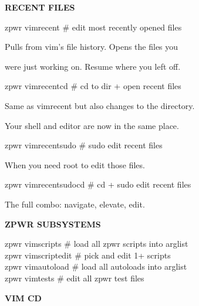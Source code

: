 \documentclass[11pt,a4paper,twoside]{book}
\begin{document}
\vspace{12pt}
{\bfseries\color{neonyellow} RECENT FILES}\vspace{4pt}

\begin{codebox}
zpwr vimrecent          \# edit most recently opened files\\
\end{codebox}

Pulls from vim's file history. Opens the files you

were just working on. Resume where you left off.

\begin{codebox}
zpwr vimrecentcd        \# cd to dir + open recent files\\
\end{codebox}

Same as vimrecent but also changes to the directory.

Your shell and editor are now in the same place.

\begin{codebox}
zpwr vimrecentsudo      \# sudo edit recent files\\
\end{codebox}

When you need root to edit those files.

\begin{codebox}
zpwr vimrecentsudocd    \# cd + sudo edit recent files\\
\end{codebox}

The full combo: navigate, elevate, edit.


\vspace{12pt}
{\bfseries\color{neonyellow} ZPWR SUBSYSTEMS}\vspace{4pt}

\begin{codebox}
zpwr vimscripts         \# load all zpwr scripts into arglist\\
zpwr vimscriptedit      \# pick and edit 1+ scripts\\
zpwr vimautoload        \# load all autoloads into arglist\\
zpwr vimtests           \# edit all zpwr test files\\
\end{codebox}


\vspace{12pt}
{\bfseries\color{neonyellow} VIM CD}\vspace{4pt}
\end{document}
